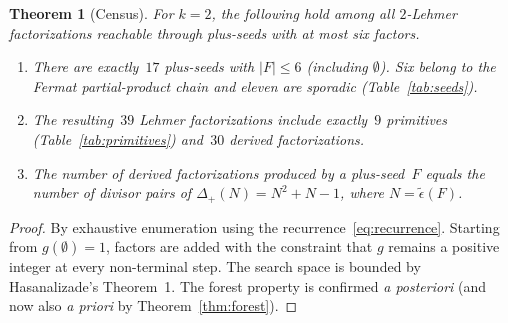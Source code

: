 \documentclass[11pt]{article}
\newtheorem{theorem}{Theorem}
\theoremstyle{definition}
\theoremstyle{remark}
\newcommand{\eps}{\tilde{\epsilon}}
\begin{document}
\begin{theorem}[Census]\label{thm:census}
For $k = 2$, the following hold among all $2$-Lehmer factorizations
reachable through plus-seeds with at most six factors.
\begin{enumerate}[label=(\alph*)]
  \item There are exactly~$17$ plus-seeds with $|F| \le 6$ (including
    $\emptyset$).  Six belong to the Fermat partial-product chain and
    eleven are sporadic (Table~\ref{tab:seeds}).
  \item The resulting~$39$ Lehmer factorizations include exactly~$9$
    primitives (Table~\ref{tab:primitives}) and~$30$ derived
    factorizations.
  \item The number of derived factorizations produced by a plus-seed~$F$
    equals the number of divisor pairs of $\Delta_+(N) = N^2 + N - 1$,
    where $N = \eps(F)$.
\end{enumerate}
\end{theorem}

\begin{proof}
By exhaustive enumeration using the recurrence~\eqref{eq:recurrence}.
Starting from $g(\emptyset) = 1$, factors are added with the constraint
that $g$ remains a positive integer at every non-terminal step.  The search
space is bounded by Hasanalizade's Theorem~1.  The forest property is
confirmed \emph{a posteriori} (and now also \emph{a priori} by
Theorem~\ref{thm:forest}).
\end{proof}
\end{document}
